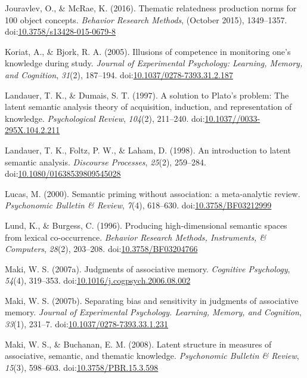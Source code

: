 \documentclass[english,man]{apa6}
\theoremstyle{definition}
\theoremstyle{definition}
\theoremstyle{remark}
\begin{document}
\hypertarget{ref-Jouravlev2016}{}
Jouravlev, O., \& McRae, K. (2016). Thematic relatedness production
norms for 100 object concepts. \emph{Behavior Research Methods},
(October 2015), 1349--1357.
doi:\href{https://doi.org/10.3758/s13428-015-0679-8}{10.3758/s13428-015-0679-8}

\hypertarget{ref-Koriat2005}{}
Koriat, A., \& Bjork, R. A. (2005). Illusions of competence in
monitoring one's knowledge during study. \emph{Journal of Experimental
Psychology: Learning, Memory, and Cognition}, \emph{31}(2), 187--194.
doi:\href{https://doi.org/10.1037/0278-7393.31.2.187}{10.1037/0278-7393.31.2.187}

\hypertarget{ref-Landauer1997}{}
Landauer, T. K., \& Dumais, S. T. (1997). A solution to Plato's problem:
The latent semantic analysis theory of acquisition, induction, and
representation of knowledge. \emph{Psychological Review}, \emph{104}(2),
211--240.
doi:\href{https://doi.org/10.1037//0033-295X.104.2.211}{10.1037//0033-295X.104.2.211}

\hypertarget{ref-Landauer1998}{}
Landauer, T. K., Foltz, P. W., \& Laham, D. (1998). An introduction to
latent semantic analysis. \emph{Discourse Processes}, \emph{25}(2),
259--284.
doi:\href{https://doi.org/10.1080/01638539809545028}{10.1080/01638539809545028}

\hypertarget{ref-Lucas2000}{}
Lucas, M. (2000). Semantic priming without association: a meta-analytic
review. \emph{Psychonomic Bulletin \& Review}, \emph{7}(4), 618--630.
doi:\href{https://doi.org/10.3758/BF03212999}{10.3758/BF03212999}

\hypertarget{ref-Lund1996}{}
Lund, K., \& Burgess, C. (1996). Producing high-dimensional semantic
spaces from lexical co-occurrence. \emph{Behavior Research Methods,
Instruments, \& Computers}, \emph{28}(2), 203--208.
doi:\href{https://doi.org/10.3758/BF03204766}{10.3758/BF03204766}

\hypertarget{ref-Maki2007a}{}
Maki, W. S. (2007a). Judgments of associative memory. \emph{Cognitive
Psychology}, \emph{54}(4), 319--353.
doi:\href{https://doi.org/10.1016/j.cogpsych.2006.08.002}{10.1016/j.cogpsych.2006.08.002}

\hypertarget{ref-Maki2007}{}
Maki, W. S. (2007b). Separating bias and sensitivity in judgments of
associative memory. \emph{Journal of Experimental Psychology. Learning,
Memory, and Cognition}, \emph{33}(1), 231--7.
doi:\href{https://doi.org/10.1037/0278-7393.33.1.231}{10.1037/0278-7393.33.1.231}

\hypertarget{ref-Maki2008}{}
Maki, W. S., \& Buchanan, E. M. (2008). Latent structure in measures of
associative, semantic, and thematic knowledge. \emph{Psychonomic
Bulletin \& Review}, \emph{15}(3), 598--603.
doi:\href{https://doi.org/10.3758/PBR.15.3.598}{10.3758/PBR.15.3.598}
\end{document}
